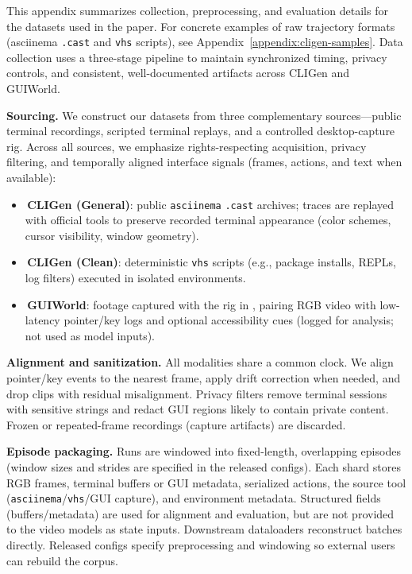 \noindent This appendix summarizes collection, preprocessing, and evaluation details for the datasets used in the paper.
For concrete examples of raw trajectory formats (asciinema \texttt{.cast} and \texttt{vhs} scripts), see Appendix~\ref{appendix:cligen-samples}. 
% 
Data collection uses a three-stage pipeline to maintain synchronized timing, privacy controls, and consistent, well-documented artifacts across CLIGen and GUIWorld.

\noindent\textbf{Sourcing.}
We construct our datasets from three complementary sources---public terminal recordings, scripted terminal replays, and a controlled desktop-capture rig.
Across all sources, we emphasize rights-respecting acquisition, privacy filtering, and temporally aligned interface signals (frames, actions, and text when available):
\begin{tcolorbox}[
  colback=metablue!8,
  colframe=metablue!40,
  boxrule=0pt,
  borderline west={1pt}{0pt}{gray!60},
  left=6pt,right=4pt,top=3pt,bottom=3pt]
\small
\begin{itemize}
  \setlength{\itemsep}{2pt}
  \setlength{\topsep}{2pt}
  \item \cligenGeneralLogo{}\,\textbf{CLIGen (General)}: public \texttt{asciinema} \texttt{.cast} archives; traces are replayed with official tools to preserve recorded terminal appearance (color schemes, cursor visibility, window geometry).
  \item \cligenCleanLogo{}\,\textbf{CLIGen (Clean)}: deterministic \texttt{vhs} scripts (e.g., package installs, REPLs, log filters) executed in isolated environments.
  \item \guiworldLogo{}\,\textbf{GUIWorld}: footage captured with the rig in , pairing RGB video with low-latency pointer/key logs and optional accessibility cues (logged for analysis; not used as model inputs).
\end{itemize}
\end{tcolorbox}

\noindent\textbf{Alignment and sanitization.} 
All modalities share a common clock.
We align pointer/key events to the nearest frame, apply drift correction when needed, and drop clips with residual misalignment.
Privacy filters remove terminal sessions with sensitive strings and redact GUI regions likely to contain private content.
Frozen or repeated-frame recordings (capture artifacts) are discarded.

\noindent\textbf{Episode packaging.}
Runs are windowed into fixed-length, overlapping episodes (window sizes and strides are specified in the released configs).
Each shard stores RGB frames, terminal buffers or GUI metadata, serialized actions, the source tool (\texttt{asciinema}/\texttt{vhs}/GUI capture), and environment metadata.
Structured fields (buffers/metadata) are used for alignment and evaluation, but are not provided to the video models as state inputs.
Downstream dataloaders reconstruct batches directly.
Released configs specify preprocessing and windowing so external users can rebuild the corpus.

